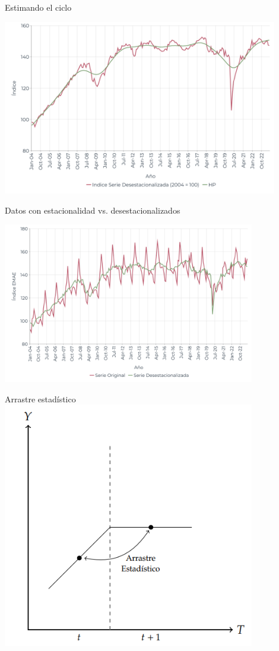 \documentclass{beamer}
\begin{document}
\begin{frame}{Estimando el ciclo}

    \centering\includegraphics[width=12cm]{../Figures/32.13.pdf}
    
\end{frame}

\begin{frame}{Datos con estacionalidad vs. desestacionalizados}

\centering\includegraphics[width=11cm]{../Figures/32.14.pdf}

\end{frame}

\begin{frame}{Arrastre estadístico}
    \centering\includegraphics[width=11cm]{../Figures/C32.16.png}
\end{frame}
\end{document}
